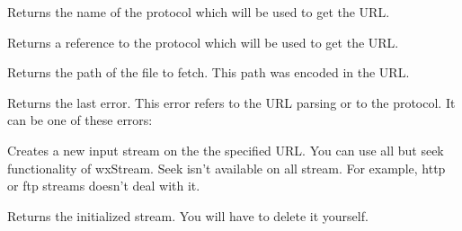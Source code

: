 
Returns the name of the protocol which will be used to get the URL.

%
%
\label{wxurlgetprotocol}


Returns a reference to the protocol which will be used to get the URL.

%
%
\label{wxurlgetpath}


Returns the path of the file to fetch. This path was encoded in the URL.

%
%
\label{wxurlgeterror}


Returns the last error. This error refers to the URL parsing or to the protocol.
It can be one of these errors:

\twocolwidtha{7cm}
\begin{twocollist}\itemsep=0pt%
\end{twocollist}%

%
%
\label{wxurlgetinputstream}


Creates a new input stream on the the specified URL. You can use all but seek
functionality of wxStream. Seek isn't available on all stream. For example,
http or ftp streams doesn't deal with it.


Returns the initialized stream. You will have to delete it yourself.



%
%
\label{wxurlsetdefaultproxy}

